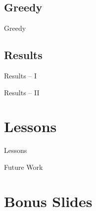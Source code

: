 \documentclass[t,10pt,
mathserif,xcolor=dvipsnames]{beamer}
\begin{document}
\subsection{Greedy}

\begin{myframe}{Greedy}

\end{myframe}

\subsection{Results}

\begin{myframe}{Results -- I}

\end{myframe}

\begin{myframe}{Results -- II}

\end{myframe}

\section{Lessons}

\begin{myframe}{Lessons}
 
\end{myframe}

\begin{myframe}{Future Work}

\end{myframe}


\section{Bonus Slides}
 
\end{document}
